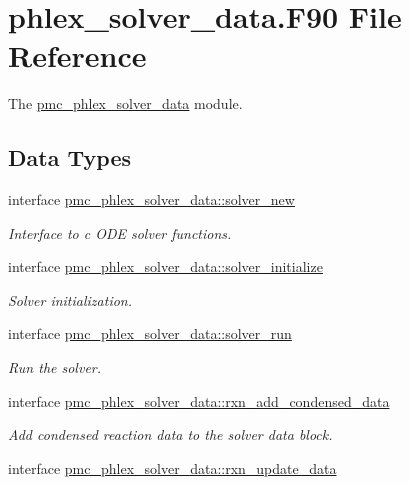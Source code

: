 \hypertarget{phlex__solver__data_8_f90}{}\section{phlex\+\_\+solver\+\_\+data.\+F90 File Reference}
\label{phlex__solver__data_8_f90}


The \mbox{\hyperlink{namespacepmc__phlex__solver__data}{pmc\+\_\+phlex\+\_\+solver\+\_\+data}} module.  


\subsection*{Data Types}
\begin{DoxyCompactItemize}
\item 
interface \mbox{\hyperlink{interfacepmc__phlex__solver__data_1_1solver__new}{pmc\+\_\+phlex\+\_\+solver\+\_\+data\+::solver\+\_\+new}}
\begin{DoxyCompactList}\small\item\em Interface to c O\+DE solver functions. \end{DoxyCompactList}\item 
interface \mbox{\hyperlink{interfacepmc__phlex__solver__data_1_1solver__initialize}{pmc\+\_\+phlex\+\_\+solver\+\_\+data\+::solver\+\_\+initialize}}
\begin{DoxyCompactList}\small\item\em Solver initialization. \end{DoxyCompactList}\item 
interface \mbox{\hyperlink{interfacepmc__phlex__solver__data_1_1solver__run}{pmc\+\_\+phlex\+\_\+solver\+\_\+data\+::solver\+\_\+run}}
\begin{DoxyCompactList}\small\item\em Run the solver. \end{DoxyCompactList}\item 
interface \mbox{\hyperlink{interfacepmc__phlex__solver__data_1_1rxn__add__condensed__data}{pmc\+\_\+phlex\+\_\+solver\+\_\+data\+::rxn\+\_\+add\+\_\+condensed\+\_\+data}}
\begin{DoxyCompactList}\small\item\em Add condensed reaction data to the solver data block. \end{DoxyCompactList}\item 
interface \mbox{\hyperlink{interfacepmc__phlex__solver__data_1_1rxn__update__data}{pmc\+\_\+phlex\+\_\+solver\+\_\+data\+::rxn\+\_\+update\+\_\+data}}

\end{DoxyCompactItemize}
